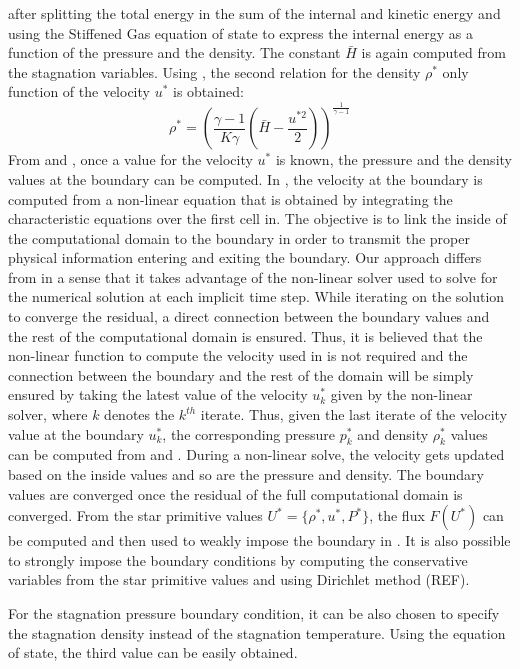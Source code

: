 after splitting the total energy in the sum of the internal and kinetic energy and using the Stiffened Gas equation of state to express the internal energy as a function of the pressure and the density. The constant $\bar{H}$ is again computed from the stagnation variables. Using , the second relation for the density $\rho^*$ only function of the velocity $u^*$ is obtained:
\begin{equation}\label{eq:scd_relation}
\rho^* = \left( \frac{\gamma-1}{K \gamma}(\bar{H}-\frac{u^{*2}}{2}) \right)^{\frac{1}{\gamma-1}}
\end{equation}
From  and , once a value for the velocity $u^*$ is known, the pressure and the density values at the boundary can be computed. In \cite{SEM}, the velocity at the boundary is computed from a non-linear equation that is obtained by integrating the characteristic equations over the first cell in. The objective is to link the inside of the computational domain to the boundary in order to transmit the proper physical information entering and exiting the boundary. Our approach differs from \cite{SEM} in a sense that it takes advantage of the non-linear solver used to solve for the numerical solution at each implicit time step. While iterating on the solution to converge the residual, a direct connection between the boundary values and the rest of the computational domain is ensured. Thus, it is believed that the non-linear function to compute the velocity used in \cite{SEM} is not required and the connection between the boundary and the rest of the domain will be simply ensured by taking the latest value of the velocity $u^*_k$ given by the non-linear solver, where $k$ denotes the $k^{th}$ iterate. Thus, given the last iterate of the velocity value at the boundary $u^*_k$, the corresponding pressure $p^*_k$ and density $\rho^*_k$ values can be computed from  and . During a non-linear solve, the velocity gets updated based on the inside values and so are the pressure and density. The boundary values are converged once the residual of the full computational domain is converged. From the star primitive values $U^* = \{\rho^*, u^*, P^* \}$, the flux $F(U^*)$ can be computed and then used to weakly impose the boundary in . It is also possible to strongly impose the boundary conditions by computing the conservative variables from the star primitive values and using Dirichlet method (REF).
\begin{remark}[]
For the stagnation pressure boundary condition, it can be also chosen to specify the stagnation density instead of the stagnation temperature. Using the equation of state, the third value can be easily obtained. 
\end{remark}
